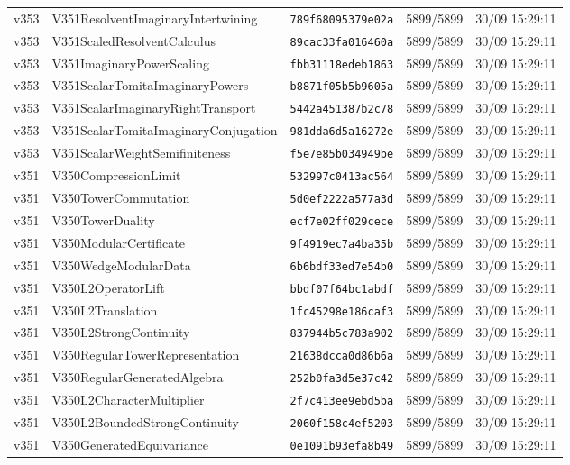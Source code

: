 \documentclass[11pt]{article}
\theoremstyle{definition}\newtheorem{deriv}{Derivation}
\begin{document}
{\begin{longtable}{@{}lllll@{}}
v353 & V351ResolventImaginaryIntertwining & \texttt{789f68095379e02a} & 5899/5899 & 30/09 15:29:11 \\
v353 & V351ScaledResolventCalculus & \texttt{89cac33fa016460a} & 5899/5899 & 30/09 15:29:11 \\
v353 & V351ImaginaryPowerScaling & \texttt{fbb31118edeb1863} & 5899/5899 & 30/09 15:29:11 \\
v353 & V351ScalarTomitaImaginaryPowers & \texttt{b8871f05b5b9605a} & 5899/5899 & 30/09 15:29:11 \\
v353 & V351ScalarImaginaryRightTransport & \texttt{5442a451387b2c78} & 5899/5899 & 30/09 15:29:11 \\
v353 & V351ScalarTomitaImaginaryConjugation & \texttt{981dda6d5a16272e} & 5899/5899 & 30/09 15:29:11 \\
v353 & V351ScalarWeightSemifiniteness & \texttt{f5e7e85b034949be} & 5899/5899 & 30/09 15:29:11 \\
v351 & V350CompressionLimit & \texttt{532997c0413ac564} & 5899/5899 & 30/09 15:29:11 \\
v351 & V350TowerCommutation & \texttt{5d0ef2222a577a3d} & 5899/5899 & 30/09 15:29:11 \\
v351 & V350TowerDuality & \texttt{ecf7e02ff029cece} & 5899/5899 & 30/09 15:29:11 \\
v351 & V350ModularCertificate & \texttt{9f4919ec7a4ba35b} & 5899/5899 & 30/09 15:29:11 \\
v351 & V350WedgeModularData & \texttt{6b6bdf33ed7e54b0} & 5899/5899 & 30/09 15:29:11 \\
v351 & V350L2OperatorLift & \texttt{bbdf07f64bc1abdf} & 5899/5899 & 30/09 15:29:11 \\
v351 & V350L2Translation & \texttt{1fc45298e186caf3} & 5899/5899 & 30/09 15:29:11 \\
v351 & V350L2StrongContinuity & \texttt{837944b5c783a902} & 5899/5899 & 30/09 15:29:11 \\
v351 & V350RegularTowerRepresentation & \texttt{21638dcca0d86b6a} & 5899/5899 & 30/09 15:29:11 \\
v351 & V350RegularGeneratedAlgebra & \texttt{252b0fa3d5e37c42} & 5899/5899 & 30/09 15:29:11 \\
v351 & V350L2CharacterMultiplier & \texttt{2f7c413ee9ebd5ba} & 5899/5899 & 30/09 15:29:11 \\
v351 & V350L2BoundedStrongContinuity & \texttt{2060f158c4ef5203} & 5899/5899 & 30/09 15:29:11 \\
v351 & V350GeneratedEquivariance & \texttt{0e1091b93efa8b49} & 5899/5899 & 30/09 15:29:11 \\

\end{longtable}}
\end{document}
